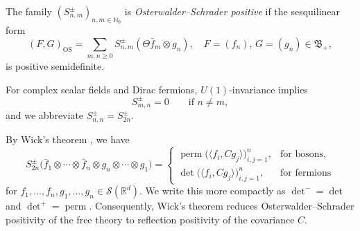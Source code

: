 \documentclass[10pt,a4paper,oneside,reqno]{amsart}
\begin{document}
\begin{definition}\label{def:OS-positivity}
    The family $(S^\pm_{n,m})_{n,m\in\mathbb N_0}$ is
    \emph{Osterwalder--Schrader positive} if the sesquilinear form
\begin{equation}
    (F,G)_{\mathrm{OS}}
    =
    \sum_{m,n\ge 0} S^\pm_{n,m}(\Theta \bar{f}_m\otimes g_n),
    \quad
    F=(f_n),\, G=(g_n)\in \mathfrak B_+,    
\end{equation}
is positive semidefinite. 
 
\end{definition}
For complex scalar fields and Dirac fermions, $U(1)$-invariance implies
\begin{equation}
    S^\pm_{m,n}=0 \qquad \text{if } n\neq m,
\end{equation}
and we abbreviate $S^\pm_{n,n}=S^\pm_{2n}$.

By Wick's theorem
\cite[Sections 8.4A and 8.4C]{Bogolubov1990GeneralTheory}
\cite[Section 8.3]{Glimm1987QuantumPhysics}, we have 
\begin{equation}
  S_{2n}^{\pm}
  \bigl(
    \bar{f}_1\otimes\cdots\otimes\bar{f}_n
    \otimes g_n\otimes\cdots\otimes g_1
  \bigr)
  =
  \begin{cases}
    \operatorname{perm}
    \bigl(\langle f_i,Cg_j\rangle\bigr)_{i,j=1}^n,
      & \text{for bosons}, \\[2mm]
    \det
    \bigl(\langle f_i,Cg_j\rangle\bigr)_{i,j=1}^n,
      & \text{for fermions}
  \end{cases}
\end{equation}
 for $f_1,\ldots,f_n,g_1,\ldots,g_n\in\mathcal S(\mathbb R^d)$. We write this more compactly as $\det^-=\det$ and $\det^+ = \operatorname{perm}$. Consequently, Wick’s theorem reduces Osterwalder–Schrader positivity of the free theory to reflection positivity of the covariance $C$.  
\end{document}
